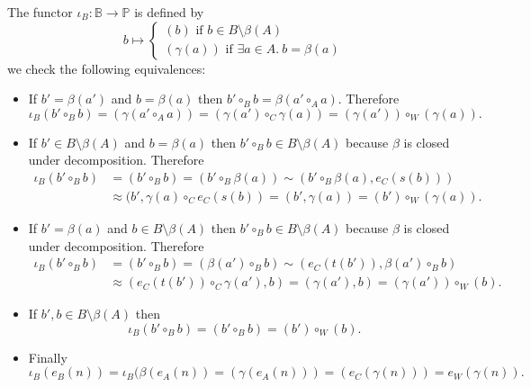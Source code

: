 \documentclass{article}
\begin{document}
\begin{definition}
	The functor $\iota_B:\mathbb{B}\rightarrow \mathbb{P}$ is defined by
	\begin{equation*}
		b\mapsto \begin{cases}
			(b) \text{ if } b\in B\setminus\beta(A)\\
			(\gamma(a)) \text{ if } \exists a\in A.~b=\beta(a)
		\end{cases}
	\end{equation*}
	we check the following equivalences:
	\begin{itemize}
		\item If $b'=\beta(a')$ and $b=\beta(a)$ then $b'\circ_B b=\beta(a'\circ_A a)$.
		Therefore
		\begin{equation*}
			\iota_B(b'\circ_B b)= (\gamma(a'\circ_A a)) = (\gamma(a')\circ_C\gamma(a)) = (\gamma(a'))\circ_W (\gamma(a)).
		\end{equation*}
		\item If $b'\in B\setminus \beta(A)$ and $b=\beta(a)$ then $b'\circ_B b\in B\setminus\beta(A)$ because $\beta$ is closed under decomposition.
		Therefore
		\begin{align*}
			\iota_B(b'\circ_B b) &= (b'\circ_B b) = (b'\circ_B \beta(a)) \sim (b'\circ_B\beta(a),e_C(s(b))) \\
			&\approx (b',\gamma(a)\circ_C e_C(s(b)) = (b',\gamma(a)) = (b')\circ_W(\gamma(a)).
		\end{align*}
		\item If $b'=\beta(a)$ and $b\in B\setminus\beta(A)$ then $b'\circ_B b\in B\setminus \beta(A)$ because $\beta$ is closed under decomposition.
		Therefore
		\begin{align*}
			\iota_B(b'\circ_B b) &= (b'\circ_B b) = (\beta(a')\circ_B b) \sim (e_C(t(b')),\beta(a')\circ_B b) \\
			&\approx (e_C(t(b'))\circ_C\gamma(a'),b) =(\gamma(a'),b)=(\gamma(a'))\circ_W (b).
		\end{align*}
		\item If $b',b\in B\setminus\beta(A)$ then
		\begin{equation*}
			\iota_B(b'\circ_B b) = (b'\circ_B b) = (b')\circ_W (b).
		\end{equation*}
		\item Finally
		$$\iota_B(e_B(n))=\iota_B(\beta(e_A(n))=(\gamma(e_A(n)))=(e_C(\gamma(n)))=e_W(\gamma(n)).$$
	\end{itemize}
\end{definition}
\end{document}
